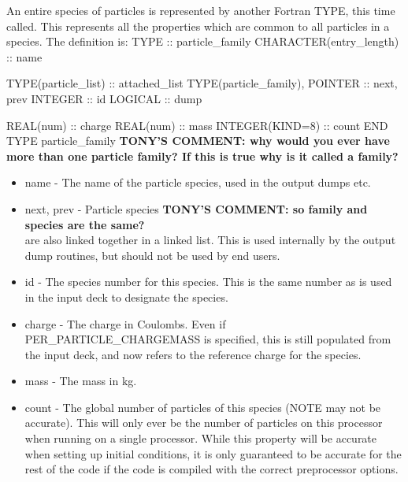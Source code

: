 \documentclass[12pt,a4paper]{article}
\newcommand{\inlinecode}[1]{{\color{warwickred} \bf\texttt{#1}}}
\newcommand{\tony}[1]{{\color{warwickred} \bf{TONY'S COMMENT:} \bf{#1}}\\}
\newenvironment{boxverbatim}{\lboxverbatim{none}}{\endlboxverbatim}
\begin{document}
An entire species of particles is represented by another Fortran TYPE, this
time called\linebreak \inlinecode{particle\_family}. This represents all the
properties which are common to all particles in a species. The definition is:
\begin{boxverbatim}
  TYPE :: particle_family
    CHARACTER(entry_length) :: name

    TYPE(particle_list) :: attached_list
    TYPE(particle_family), POINTER :: next, prev
    INTEGER :: id
    LOGICAL :: dump

    REAL(num) :: charge
    REAL(num) :: mass
    INTEGER(KIND=8) :: count
  END TYPE particle_family
\end{boxverbatim}
\tony{why would you ever have more than one particle family? If this is true
why is it called a family?}

\begin{itemize}
\item name - The name of the particle species, used in the output dumps etc.
\item next, prev - Particle species \tony{so family and species are the same?}
are also linked together in a linked
  list. This is used internally by the output dump routines, but should not be
  used by end users.
\item id - The species number for this species. This is the same number as is
  used in the input deck to designate the species.
\item charge - The charge in Coulombs. Even if PER\_PARTICLE\_CHARGEMASS is
  specified, this is still populated from the input deck, and now refers to
  the reference charge for the species.
\item mass - The mass in kg.
\item count - The global number of particles of this species (NOTE may not
  be accurate). This will only ever be the number of particles on this
  processor when running on a single processor. While this property will be
  accurate when setting up initial conditions, it is only guaranteed to be
  accurate for the rest of the code if the code is compiled with the correct
  preprocessor options.
\end{itemize}
\end{document}
